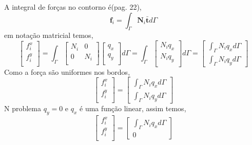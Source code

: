 A integral de forças no contorno é(pag. 22),
%
\begin{equation}
	\mathbf{f}_i = \int_{\Gamma} \mathbf{N}_i \mathbf{\bar t} d\Gamma
\end{equation}
%
em notação matricial temos,
%
\begin{equation}
	\begin{bmatrix}
		f^x_i\\
		f^y_i\\
	\end{bmatrix}
	=
	\int_{\Gamma}
	\begin{bmatrix}
		N_i&0\\
		0&N_i\\
	\end{bmatrix}
	\begin{bmatrix}
		q_x\\
		q_y\\
	\end{bmatrix}
	d\Gamma
	=
	\int_{\Gamma}
	\begin{bmatrix}
		N_i q_x\\
		N_i q_y\\
	\end{bmatrix}
	d\Gamma
	=
	\begin{bmatrix}
		\int_{\Gamma} N_i q_x d\Gamma\\
		\int_{\Gamma} N_i q_y d\Gamma
	\end{bmatrix}
\end{equation}
%
Como a força são uniformes nos bordos,
%
\begin{equation}
	\begin{bmatrix}
		f^x_i\\
		f^y_i\\
	\end{bmatrix}
	=
	\begin{bmatrix}
		 \int_{\Gamma} N_i q_x d\Gamma\\
         \int_{\Gamma} N_i q_y d\Gamma
	\end{bmatrix}
\end{equation}
%
N problema $q_y = 0$ e $q_x$ é uma função linear, assim temos,
%
\begin{equation}
	\begin{bmatrix}
		f^x_i\\
		f^y_i\\
	\end{bmatrix}
	=
	\begin{bmatrix}
		\int_{\Gamma} N_i q_x d\Gamma\\
		0
	\end{bmatrix}
\end{equation}
